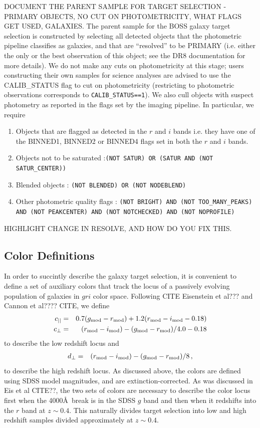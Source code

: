 \documentclass[preprint]{aastex}
\newcommand{\cpp}{c_{\perp}}
\newcommand{\cll}{c_{||}}
\newcommand{\dpp}{d_{\perp}}
\newcommand{\gmod}{g_{\rm mod}}
\newcommand{\rmod}{r_{\rm mod}}
\newcommand{\imod}{i_{\rm mod}}
\begin{document}
DOCUMENT THE PARENT SAMPLE FOR TARGET SELECTION - PRIMARY OBJECTS, NO CUT ON 
PHOTOMETRICITY, WHAT FLAGS GET USED, GALAXIES.
The parent sample for the BOSS galaxy target selection is constructed by
selecting all detected objects that the photometric pipeline classifies as
galaxies, and that are ``resolved'' to be PRIMARY (i.e. either the only or the
best observation of this object; see the DR8 documentation for more details). We
do not make any cuts on photometricity at this stage; users constructing their
own samples for science analyses are advised to use the CALIB\_STATUS flag to
cut on photometricity (restricting to photometric observations corresponds to
\texttt{CALIB\_STATUS==1}). We also cull objects with suspect photometry as
reported in the flags set by the imaging pipeline. In particular, we require
\begin{enumerate}
  \item Objects that are flagged as detected in the $r$ and $i$ bands i.e. they
  have one of the BINNED1, BINNED2 or BINNED4 flags set in both the $r$ and $i$ bands.
  \item Objects not to be saturated :\texttt{(NOT SATUR) OR (SATUR AND (NOT
  SATUR\_CENTER))}
  \item Blended objects : \texttt{(NOT BLENDED) OR (NOT NODEBLEND)}
  \item Other photometric quality flags : \texttt{(NOT BRIGHT) AND (NOT
  TOO\_MANY\_PEAKS) AND (NOT PEAKCENTER) AND (NOT NOTCHECKED) AND (NOT
  NOPROFILE)}
\end{enumerate}

HIGHLIGHT CHANGE IN RESOLVE, AND HOW DO YOU FIX THIS. 

\subsection{Color Definitions}

In order to succintly describe the galaxy target selection, it is convenient to
define a set of auxiliary colors that track the locus of a passively evolving
population of galaxies in $gri$ color space. Following CITE Eisenstein et al???
and Cannon et al???? CITE, we define 
\begin{eqnarray}
\cll & = &  0.7 (\gmod - \rmod) + 1.2(\rmod - \imod - 0.18)  \\
\cpp & = & (\rmod - \imod) - (\gmod - \rmod)/4.0 - 0.18 
\end{eqnarray}
to describe the low redshift locus and 
\begin{eqnarray}
\dpp & = & (\rmod - \imod) - (\gmod - \rmod)/8 \,,
\end{eqnarray}
to describe the high redshift locus. As discussed above, the colors are defined
using SDSS model magnitudes, and are extinction-corrected. As was discussed in
Eis et al CITE??, the two sets of colors are necessary to describe the color
locus first when the 4000\AA\ break is in the SDSS $g$ band and then when it
redshifts into the $r$ band at $z\sim0.4$. This naturally divides target
selection into low and high redshift samples divided approximately at
$z\sim0.4$. 
\end{document}

